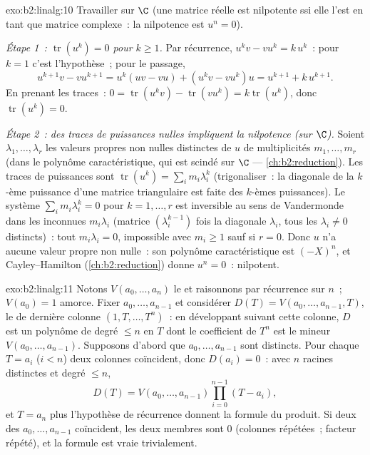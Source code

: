 \begin{solution}{exo:b2:linalg:10}
Travailler sur $\C$ (une matrice réelle est nilpotente ssi elle l'est en
tant que matrice complexe~: la nilpotence est $u^n = 0$).

\emph{Étape 1~: $\operatorname{tr}(u^k) = 0$ pour $k \geq 1$.} Par
récurrence, $u^k v - v u^k = k\, u^k$~: pour $k = 1$ c'est
l'hypothèse~; pour le passage,
\[
u^{k+1}v - vu^{k+1} = u^k(uv - vu) + (u^k v - v u^k)u
= u^{k+1} + k\,u^{k+1} .
\]
En prenant les traces~: $0 = \operatorname{tr}(u^k v) -
\operatorname{tr}(vu^k) = k \operatorname{tr}(u^k)$, donc
$\operatorname{tr}(u^k) = 0$.

\emph{Étape 2~: des traces de puissances nulles impliquent la nilpotence
(sur $\C$).} Soient $\lambda_1, \dots, \lambda_r$ les valeurs propres
non nulles distinctes de $u$ de multiplicités $m_1, \dots, m_r$ (dans le
polynôme caractéristique, qui est scindé sur $\C$ ---
\cref{ch:b2:reduction}). Les traces de puissances sont $\operatorname{tr}(u^k) =
\sum_i m_i \lambda_i^k$ (trigonaliser~: la diagonale de la $k$-ème
puissance d'une matrice triangulaire est faite des $k$-èmes puissances).
Le système $\sum_i m_i \lambda_i^k = 0$ pour $k = 1, \dots, r$ est
inversible au sens de Vandermonde dans les inconnues $m_i\lambda_i$
(matrice $(\lambda_i^{k-1})$ fois la diagonale $\lambda_i$, tous les
$\lambda_i \neq 0$ distincts)~: tout $m_i \lambda_i = 0$, impossible
avec $m_i \geq 1$ sauf si $r = 0$. Donc $u$ n'a aucune valeur propre non
nulle~: son polynôme caractéristique est $(-X)^n$, et Cayley--Hamilton
(\cref{ch:b2:reduction}) donne $u^n = 0$~: nilpotent.
\end{solution}

\begin{solution}{exo:b2:linalg:11}
Notons $V(a_0, \dots, a_n)$ le  et raisonnons par récurrence
sur $n$~; $V(a_0) = 1$ amorce. Fixer $a_0, \dots, a_{n-1}$ et considérer
$D(T) = V(a_0, \dots, a_{n-1}, T)$, le  de dernière colonne
$(1, T, \dots, T^n)$~: en développant suivant cette colonne, $D$ est un
polynôme de degré $\leq n$ en $T$ dont le coefficient de $T^n$ est le
mineur $V(a_0, \dots, a_{n-1})$. Supposons d'abord que $a_0, \dots,
a_{n-1}$ sont distincts. Pour chaque $T = a_i$ ($i < n$) deux colonnes
coïncident, donc $D(a_i) = 0$~: avec $n$ racines distinctes et degré
$\leq n$,
\[
D(T) = V(a_0, \dots, a_{n-1}) \prod_{i=0}^{n-1}(T - a_i),
\]
et $T = a_n$ plus l'hypothèse de récurrence donnent la formule du
produit. Si deux des $a_0, \dots, a_{n-1}$ coïncident, les deux membres
sont $0$ (colonnes répétées~; facteur répété), et la formule est vraie
trivialement.
\end{solution}

